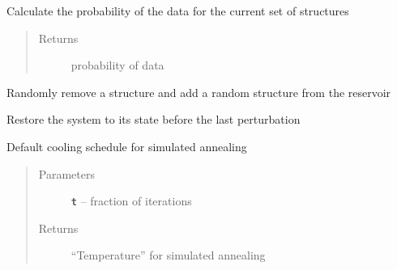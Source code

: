 \documentclass[letterpaper,10pt,english]{sphinxmanual}
\begin{document}
\begin{fulllineitems}
\begin{fulllineitems}
\end{fulllineitems}


\begin{fulllineitems}
\label{modules:eisd.EISDOPT._calc_data_prob}
Calculate the probability of the data for the current set of structures
\begin{quote}\begin{description}
\item[{Returns}] \leavevmode
probability of data

\end{description}\end{quote}

\end{fulllineitems}


\begin{fulllineitems}
\label{modules:eisd.EISDOPT._perturb}
Randomly remove a structure and add a random structure from the
reservoir

\end{fulllineitems}


\begin{fulllineitems}
\label{modules:eisd.EISDOPT._restore}
Restore the system to its state before the last perturbation

\end{fulllineitems}


\begin{fulllineitems}
\label{modules:eisd.EISDOPT.default_cool}
Default cooling schedule for simulated annealing
\begin{quote}\begin{description}
\item[{Parameters}] \leavevmode
\textbf{\texttt{t}} -- fraction of iterations

\item[{Returns}] \leavevmode
``Temperature'' for simulated annealing

\end{description}\end{quote}


\end{fulllineitems}
\end{fulllineitems}
\end{document}
